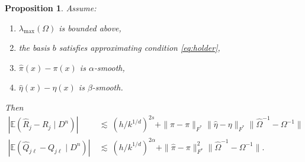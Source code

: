\documentclass[11pt,twoside]{article}
\newcommand{\Pb}{\mathbb{P}}
\newcommand{\E}{\mathbb{E}}
\newtheorem{propositionapp}{Proposition}
\theoremstyle{definition}
\theoremstyle{remark}
\begin{document}
\begin{propositionapp} \label{prop:bias_alt}
Assume:
\begin{enumerate}
\item $\lambda_{\max}(\Omega)$ is bounded above, 
\item the basis $b$ satisfies approximating condition \eqref{eq:holder}, 
\item $\widehat\pi(x) - \pi(x)$ is $\alpha$-smooth, 
\item $\widehat\eta(x) - \eta(x)$ is $\beta$-smooth.
\end{enumerate}
Then
\begin{align*}
| \E(\widehat{R}_j - R_j \mid D^n) | & \ \lesssim \ \left(h/k^{1/d} \right)^{2s} + \| \widehat\pi - \pi \|_{F^*} \| \widehat\eta - \eta \|_{F^*} \| \widehat\Omega^{-1}-\Omega^{-1} \|  \\
| \E(\widehat{Q}_{j\ell} - Q_{j\ell} \mid D^n) | & \ \lesssim \ \left( h/k^{1/d} \right)^{2\alpha} + \| \widehat\pi - \pi \|_{F^*}^2 \| \widehat\Omega^{-1}-\Omega^{-1} \| . 
\end{align*}
\end{propositionapp}

\bigskip
\end{document}
